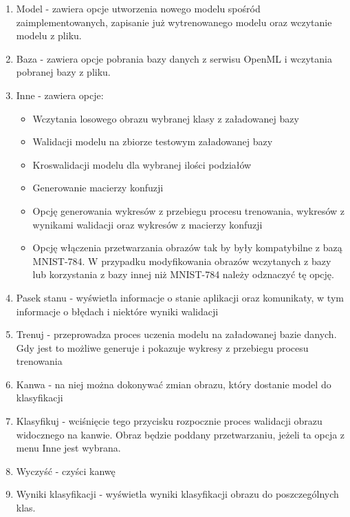 \documentclass{article}
\begin{document}
\begin{enumerate}
    \item Model - zawiera opcje utworzenia
     nowego modelu spośród zaimplementowanych,
     zapisanie już wytrenowanego modelu oraz wczytanie
     modelu z pliku.
    \item Baza - zawiera opcje pobrania bazy danych
     z serwisu OpenML i wczytania pobranej bazy z pliku.

    \item Inne - zawiera opcje:
        \begin{itemize}
            \item Wczytania losowego obrazu wybranej klasy z załadowanej bazy
            \item Walidacji modelu na zbiorze testowym załadowanej bazy
            \item Kroswalidacji modelu dla wybranej ilości podziałów
            \item Generowanie macierzy konfuzji
            \item Opcję generowania wykresów z przebiegu procesu trenowania, wykresów z wynikami walidacji oraz wykresów z macierzy konfuzji
            \item Opcję włączenia przetwarzania obrazów tak by były kompatybilne z bazą MNIST-784. W przypadku modyfikowania obrazów wczytanych z bazy lub korzystania z bazy innej niż MNIST-784 należy odznaczyć tę opcję.
        \end{itemize}

    \item Pasek stanu - wyświetla informacje o stanie aplikacji oraz komunikaty, w tym informacje o błędach i niektóre wyniki walidacji
    \item Trenuj - przeprowadza proces uczenia modelu na załadowanej bazie danych. Gdy jest to możliwe generuje i pokazuje wykresy z przebiegu procesu trenowania
    \item Kanwa - na niej można dokonywać zmian obrazu, który dostanie model do klasyfikacji
    \item Klasyfikuj - wciśnięcie tego przycisku rozpocznie proces walidacji obrazu widocznego na kanwie. Obraz będzie poddany przetwarzaniu, jeżeli ta opcja z menu Inne jest wybrana.
    \item Wyczyść - czyści kanwę
    \item Wyniki klasyfikacji - wyświetla wyniki klasyfikacji obrazu do poszczególnych klas.
\end{enumerate}
\end{document}
